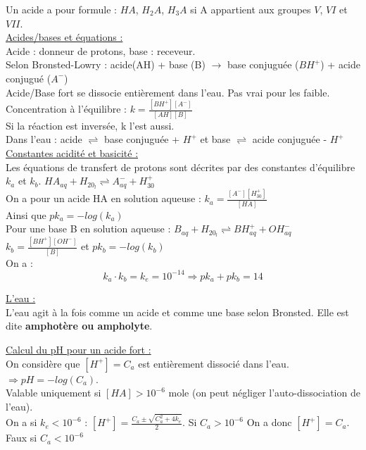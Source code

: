 \documentclass[../main.tex]{subfiles}
\begin{document}
Un acide a pour formule : $HA$, $H_2A$, $H_3A$ si A appartient aux groupes $V$, $VI$ et $VII$.\\

\quad \underline{Acides/bases et équations :}\\
Acide : donneur de protons, base : receveur.\\
Selon Bronsted-Lowry : acide(AH) + base (B) $\rightarrow$ base conjuguée ($BH^+$) + acide conjugué ($A^-$)\\ 
Acide/Base fort se dissocie entièrement dans l'eau. Pas vrai pour les faible.\\
Concentration à l'équilibre : $k = \frac{[BH^+][A^-]}{[AH][B]}$\\
Si la réaction est inversée, k l'est aussi.\\
Dans l'eau : acide $\rightleftharpoons$ base conjuguée + $H^+$ et base $\rightleftharpoons$ acide conjuguée - $H^+$\\

\quad \underline{Constantes acidité et basicité :}\\
Les équations de transfert de protons sont décrites par des constantes d'équilibre $k_a$ et $k_b$. $HA_{aq} + H_20_l \rightleftharpoons A^-_{aq} + H_30^+$\\
On a pour un acide HA en solution aqueuse : $k_a = \frac{[A^-][H_30^+]}{[HA]}$\\
Ainsi que $pk_a = -log(k_a)$\\
Pour une base B en solution aqueuse : $B_{aq} + H_20_l \rightleftharpoons BH^+_{aq} + OH^-_{aq}$\\
$k_b = \frac{[BH^+][OH^-]}{[B]}$ et $pk_b = -log(k_b)$\\

On a : \\
\begin{equation}
    k_a\cdot k_b = k_e = 10^{-14} \Rightarrow pk_a + pk_b = 14
\end{equation}

\quad \underline{L'eau :}\\
L'eau agit à la fois comme un acide et comme une base selon Bronsted. Elle est dite \textbf{amphotère ou ampholyte}.

\quad \underline{Calcul du pH pour un acide fort :}\\
On considère que $[H^+] = C_a$ est entièrement dissocié dans l'eau. $\Rightarrow pH = -log(C_a)$.\\
Valable uniquement si $[HA] > 10^{-6}$ mole (on peut négliger l'auto-dissociation de l'eau).\\
On a si $k_e < 10^{-6}$ : $[H^+] = \frac{C_a \pm \sqrt{C_a^2 + 4k_e}}{2}$. Si $C_a > 10^{-6}$ On a donc $[H^+] = C_a$. \warning Faux si $C_a < 10^{-6}$\\
\end{document}
